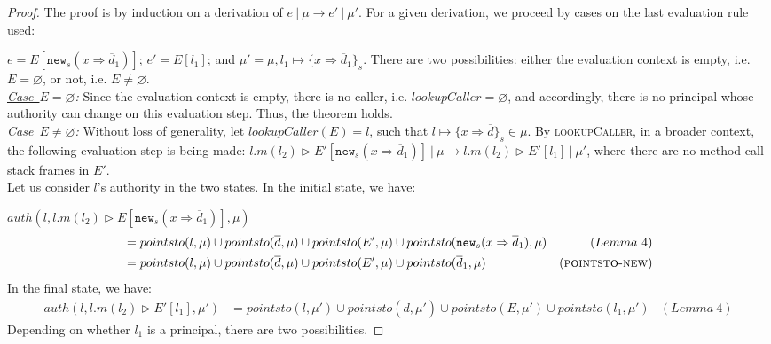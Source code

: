\documentclass{llncs}
\newcommand{\keywadj}[1]{\mathtt{#1}}
\begin{document}
\newpage
\begin{proof} The proof is by induction on a derivation of $e~|~\mu \longrightarrow e'~|~\mu'$. For a given derivation, we proceed by cases on the last evaluation rule used:\\

\sloppy 

\noindent{}
$e = E[\keywadj{new}_s(x \Rightarrow \overline{d}_1)]$; $e' = E[l_1]$; and $\mu' = \mu, l_1 \mapsto \{ x \Rightarrow \overline{d}_1 \}_s$. There are two possibilities: either the evaluation context is empty, i.e. $E = \varnothing$, or not, i.e. $E \not= \varnothing$.\\

\noindent\textit{\mbox{\underline{Case $E = \varnothing$}}:} Since the evaluation context is empty, there is no caller, i.e. $lookupCaller = \varnothing$, and accordingly, there is no principal whose authority can change on this evaluation step. Thus, the theorem holds.\\

\noindent\textit{\mbox{\underline{Case $E \not= \varnothing$}}:} Without loss of generality, let \mbox{$lookupCaller(E) = l$}, such that \mbox{$l \mapsto \{ x \Rightarrow \overline{d} \}_{s} \in \mu$}. By \textsc{lookupCaller}, in a broader context, the following evaluation step is being made: \mbox{$l.m(l_2) \rhd E'[\keywadj{new}_s(x \Rightarrow \overline{d}_1)]~|~\mu \longrightarrow l.m(l_2) \rhd E'[l_1]~|~\mu'$}, where there are no method call stack frames in $E'$.\\

\noindent Let us consider $l$'s authority in the two states. In the initial state, we have:

\noindent$auth(l, l.m(l_2) \rhd E[\keywadj{new}_s(x \Rightarrow \overline{d}_1)], \mu)$
\vspace{-7pt}
\begin{align*}
&= pointsto(l, \mu) \cup pointsto(\overline{d}, \mu) \cup pointsto(E', \mu) \cup pointsto(\keywadj{new}_s(x \Rightarrow \overline{d}_1), \mu) & (Lemma~4)\\
&= pointsto(l, \mu) \cup pointsto(\overline{d}, \mu) \cup pointsto(E', \mu) \cup pointsto(\overline{d}_1, \mu) & (\textsc{pointsto-new})
\end{align*}
In the final state, we have:
\begin{align*}
auth(l, l.m(l_2) \rhd E'[l_1], \mu') &= pointsto(l, \mu') \cup pointsto(\overline{d}, \mu') \cup pointsto(E, \mu') \cup pointsto(l_1, \mu') & (Lemma~4)
\end{align*}
Depending on whether $l_1$ is a principal, there are two possibilities.


\end{proof}
\end{document}
